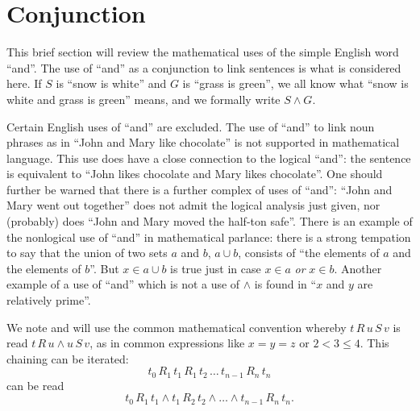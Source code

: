 \documentclass[12pt]{book}
\begin{document}
\section{Conjunction}

This brief section will review the mathematical uses of the simple
English word ``and''.  The use of ``and'' as a conjunction to link
sentences is what is considered here.  If $S$ is ``snow is white'' and
$G$ is ``grass is green'', we all know what ``snow is white and grass
is green'' means, and we formally write $S \wedge G$.

Certain English uses of ``and'' are excluded.  The use of ``and'' to
link noun phrases as in ``John and Mary like chocolate'' is not
supported in mathematical language.  This use does have a close
connection to the logical ``and'': the sentence is equivalent to
``John likes chocolate and Mary likes chocolate''.  One should further
be warned that there is a further complex of uses of ``and'': ``John
and Mary went out together'' does not admit the logical analysis just
given, nor (probably) does ``John and Mary moved the half-ton safe''.
There is an example of the nonlogical use of ``and'' in mathematical
parlance: there is a strong tempation to say that the union of two
sets $a$ and $b$, $a \cup b$, consists of ``the elements of $a$ and
the elements of $b$''.  But $x \in a \cup b$ is true just in case $x
\in a$ {\em or\/} $x \in b$.  Another example of a use of ``and''
which is not a use of $\wedge$ is found in ``$x$ and $y$ are
relatively prime''.

We note and will use the common mathematical convention whereby $t
\,R\,u \,S\, v$ is read $t\,R\,u \wedge u \,S\,v$, as in common
expressions like $x=y=z$ or $2 < 3 \leq 4$.  This chaining can be
iterated:
$$t_0 \, R_1 \, t_1 \, R_1 \,t_2 \, \ldots \, t_{n-1} \, R_n \, t_n$$
can be read $$t_0 \,R_1 \, t_1 \wedge t_1 \,R_2 \, t_2 \wedge \ldots \wedge t_{n-1} \,R_n\,t_n.$$
\end{document}

